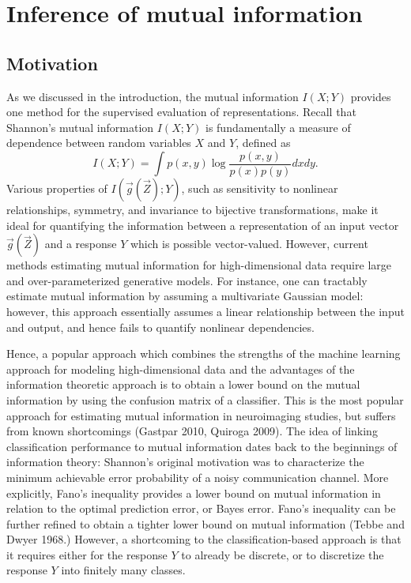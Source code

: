 
\chapter{Inference of mutual information} %

\label{Chapter4} %

\section{Motivation}

As we discussed in the introduction, the mutual information $I(X; Y)$
provides one method for the supervised evaluation of representations.
Recall that Shannon's mutual information $I(X; Y)$ is fundamentally a
measure of dependence between random variables $X$ and $Y$, defined as
\[
I(X;Y) = \int p(x, y) \log \frac{p(x, y)}{p(x)p(y)}dxdy.
\]
Various properties of $I(\vec{g}(\vec{Z}); Y)$, such as sensitivity to
nonlinear relationships, symmetry, and invariance to bijective
transformations, make it ideal for quantifying the information between
a representation of an input vector $\vec{g}(\vec{Z})$ and a response
$Y$ which is possible vector-valued.  However, current methods
estimating mutual information for high-dimensional data require large
and over-parameterized generative models.  For instance, one can
tractably estimate mutual information by assuming a multivariate
Gaussian model: however, this approach essentially assumes a linear
relationship between the input and output, and hence fails to quantify
nonlinear dependencies.  

Hence, a popular approach which combines the strengths of the machine
learning approach for modeling high-dimensional data and the
advantages of the information theoretic approach is to obtain a lower
bound on the mutual information by using the confusion matrix of a
classifier.  This is the most popular approach for estimating mutual
information in neuroimaging studies, but suffers from known
shortcomings (Gastpar 2010, Quiroga 2009).  The idea of linking
classification performance to mutual information dates back to the
beginnings of information theory: Shannon's original motivation was to
characterize the minimum achievable error probability of a noisy
communication channel.  More explicitly, Fano's inequality provides a
lower bound on mutual information in relation to the optimal
prediction error, or Bayes error.  Fano's inequality can be further
refined to obtain a tighter lower bound on mutual information (Tebbe
and Dwyer 1968.)  However, a shortcoming to the classification-based
approach is that it requires either for the response $Y$ to already be
discrete, or to discretize the response $Y$ into finitely many
classes.

